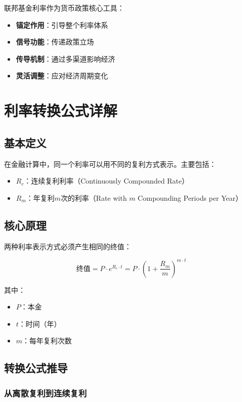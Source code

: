 联邦基金利率作为货币政策核心工具：
\begin{itemize}
    \item \textbf{锚定作用}：引导整个利率体系
    \item \textbf{信号功能}：传递政策立场
    \item \textbf{传导机制}：通过多渠道影响经济
    \item \textbf{灵活调整}：应对经济周期变化
\end{itemize}


\section{利率转换公式详解}

\subsection{基本定义}

在金融计算中，同一个利率可以用不同的复利方式表示。主要包括：

\begin{itemize}
    \item $R_c$：连续复利利率（Continuously Compounded Rate）
    \item $R_m$：年复利$m$次的利率（Rate with $m$ Compounding Periods per Year）
\end{itemize}

\subsection{核心原理}

两种利率表示方式必须产生相同的终值：

\begin{equation}
\text{终值} = P \cdot e^{R_c \cdot t} = P \cdot \left(1 + \frac{R_m}{m}\right)^{m \cdot t}
\end{equation}

其中：
\begin{itemize}
    \item $P$：本金
    \item $t$：时间（年）
    \item $m$：每年复利次数
\end{itemize}

\subsection{转换公式推导}

\subsubsection{从离散复利到连续复利}


